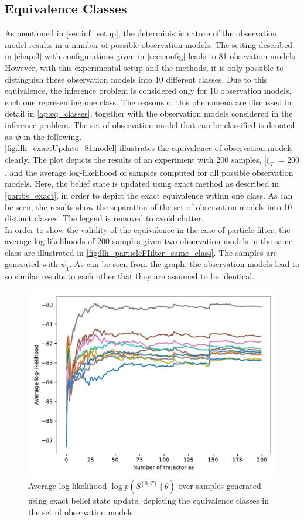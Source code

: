 \subsection{Equivalence Classes}
\label{sec:eq_classes}
As mentioned in \cref{sec:inf_setup}, the deterministic nature of the observation model results in a number of possible observation models. The setting described in \cref{chap:3} with configurations given in \cref{sec:config} leads to 81 obsevation models. However, with this experimental setup and the methods, it is only possible to distinguish these observation models into 10 different classes. Due to this equivalence, the inference problem is considered only for 10 observation models, each one representing one class. The reasons of this phenomena are discussed in detail in \cref{ap:eq_classes}, together with the observation models considered in the inference problem. The set of observation model that can be classified is denoted as $ \symbf{\psi} $ in the following. \\
\autoref{fig:llh_exactUpdate_81model} illustrates the equivalence of observation models clearly. The plot depicts the results of an experiment with 200 samples, $ |\xi_T| = 200 $, and the average log-likelihood of samples computed for all possible observation models. Here, the belief state is updated using exact method as described in \cref{par:bs_exact}, in order to depict the exact equivalence within one class. As can be seen, the results show the separation of the set of observation models into 10 distinct classes. The legend is removed to avoid clutter.\\
In order to show the validity of the equivalence in the case of particle filter, the average log-likelihoods of 200 samples given two observation models in the same class are illustrated in \autoref{fig:llh_particleFIilter_same_class}. The samples are generated with $ \psi_1 $. As can be seen from the graph, the observation models lead to so similar results to each other that they are assumed to be identical. 
\begin{figure}[H]
	\begin{center}
		\includegraphics[width=.65\textwidth]{figures/equivalence_classes/llh_exactUpdate_81model}
		\caption{Average log-likelihood $ \log p(S^{[0,T]} \mid \theta) $ over samples generated using exact belief state update, depicting the equivalence classes in the set of observation models}
		\label{fig:llh_exactUpdate_81model}
	\end{center}
\end{figure}
